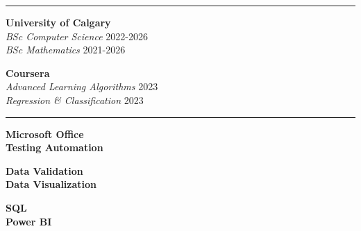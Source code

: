 \documentclass[a4paper,11pt]{article}
\def\sectionv{\vspace{.2cm}}
\def\betweenjobsv{\vspace{0.4cm}}
\def\betweenskillsh{\hspace{1.4cm}}
\begin{document}
\betweenjobsv

\noindent {}
\vspace{-2.35em} %
\par\noindent
\rule{\textwidth}{0.4pt}

\sectionv

\noindent
\begin{minipage}[t]{0.45\textwidth} %
    \textbf{University of Calgary} \\
    \textit{BSc Computer Science} \hfill 2022-2026 \\
    \textit{BSc Mathematics} \hfill 2021-2026
\end{minipage}
\hfill %
\begin{minipage}[t]{0.45\textwidth} %
    \textbf{Coursera} \\
    \textit{Advanced Learning Algorithms} \hfill 2023 \\
    \textit{Regression \& Classification} \hfill 2023
\end{minipage}

\betweenjobsv
\sectionv

\noindent {}
\vspace{-2.35em} %
\par\noindent
\rule{\textwidth}{0.4pt}

\sectionv

\noindent
\begin{minipage}[t]{0.32\textwidth} %
    \textbf{Microsoft Office} \\
    \textbf{Testing Automation} \\
\end{minipage}
\betweenskillsh
\begin{minipage}[t]{0.32\textwidth} %
    \textbf{Data Validation} \\
    \textbf{Data Visualization} \\
\end{minipage}
\betweenskillsh
\begin{minipage}[t]{0.32\textwidth} %
    \textbf{SQL} \\
    \textbf{Power BI} \\
\end{minipage}
\end{document}
